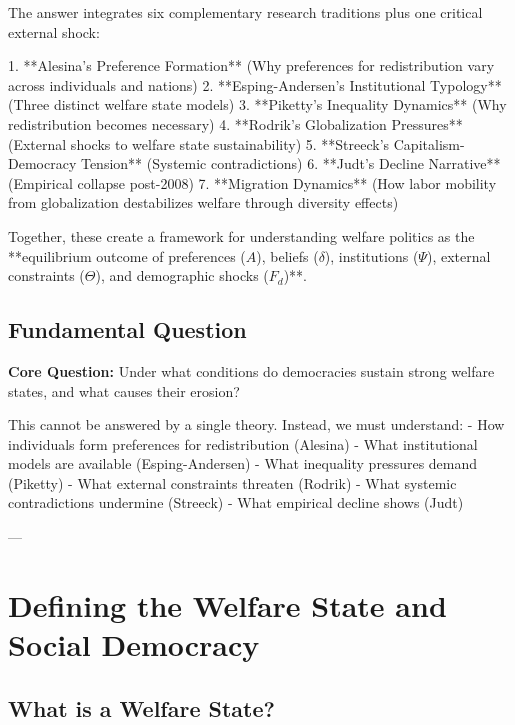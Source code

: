 The answer integrates six complementary research traditions plus one critical external shock:

1. **Alesina's Preference Formation** (Why preferences for redistribution vary across individuals and nations)
2. **Esping-Andersen's Institutional Typology** (Three distinct welfare state models)
3. **Piketty's Inequality Dynamics** (Why redistribution becomes necessary)
4. **Rodrik's Globalization Pressures** (External shocks to welfare state sustainability)
5. **Streeck's Capitalism-Democracy Tension** (Systemic contradictions)
6. **Judt's Decline Narrative** (Empirical collapse post-2008)
7. **Migration Dynamics** (How labor mobility from globalization destabilizes welfare through diversity effects)

Together, these create a framework for understanding welfare politics as the **equilibrium outcome of preferences ($A$), beliefs ($\delta$), institutions ($\Psi$), external constraints ($\Theta$), and demographic shocks ($F_d$)**.

\subsection*{Fundamental Question}

\textbf{Core Question:} Under what conditions do democracies sustain strong welfare states, and what causes their erosion?

This cannot be answered by a single theory. Instead, we must understand:
- How individuals form preferences for redistribution (Alesina)
- What institutional models are available (Esping-Andersen)
- What inequality pressures demand (Piketty)
- What external constraints threaten (Rodrik)
- What systemic contradictions undermine (Streeck)
- What empirical decline shows (Judt)

---

\clearpage


\section{Defining the Welfare State and Social Democracy}
\label{sec:definition}

\subsection{What is a Welfare State?}

